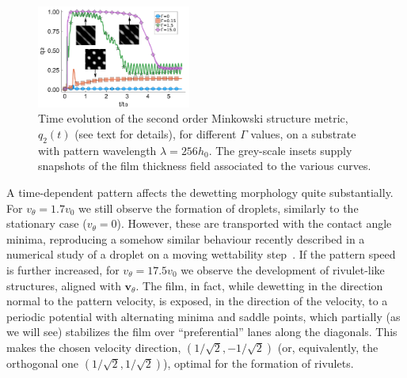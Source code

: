 \documentclass[twocolumn,amsmath,amssymb,showpacs,prl,superscriptaddress]{revtex4-1} %
\begin{document}
\begin{figure}
    \centering
    \includegraphics[width=0.45\textwidth]{Figure_4.pdf}
    \caption{Time evolution of the second order Minkowski structure metric, $q_2(t)$ (see text for details), for different $\Gamma$ values, on a substrate with pattern wavelength $\lambda=256 h_0$.
    The grey-scale insets supply snapshots of the film thickness field associated to the various curves.
    }
    \label{fig:msm_q2}
\end{figure}
A time-dependent pattern affects the dewetting morphology quite substantially.
For $v_{\theta} = 1.7 v_0$ we still observe the formation of droplets, similarly to the stationary case ($v_{\theta} = 0$). However, these are transported with the contact angle minima, reproducing a somehow similar behaviour recently described in a numerical study of a droplet on a moving wettability step~\cite{GrawitterStark1}.
If the pattern speed is further increased, for $v_{\theta} = 17.5 v_0$ we observe the development of rivulet-like structures, aligned with $\mathbf{v}_{\theta}$. 
The film, in fact, while dewetting in the direction normal to the pattern velocity, is exposed, in the direction of the velocity, to a periodic potential with alternating minima and saddle points, which partially (as we will see) stabilizes the film over ``preferential'' lanes along the diagonals. 
This makes the chosen velocity direction, $(1/\sqrt{2},-1/\sqrt{2})$ (or, equivalently, the orthogonal one $(1/\sqrt{2},1/\sqrt{2})$), optimal for the formation of rivulets. 
\end{document}
